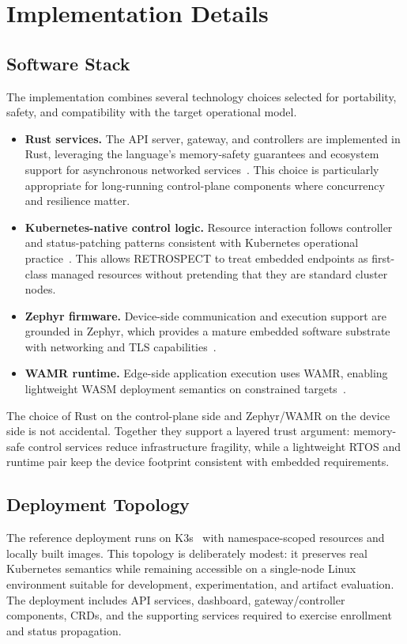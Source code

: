 \section{Implementation Details}

\subsection{Software Stack}
The implementation combines several technology choices selected for portability, safety, and compatibility with the target operational model.
\begin{itemize}
    \item \textbf{Rust services.} The API server, gateway, and controllers are implemented in Rust, leveraging the language's memory-safety guarantees and ecosystem support for asynchronous networked services~\cite{rust}. This choice is particularly appropriate for long-running control-plane components where concurrency and resilience matter.
    \item \textbf{Kubernetes-native control logic.} Resource interaction follows controller and status-patching patterns consistent with Kubernetes operational practice~\cite{kubernetes,kubernetes_operators}. This allows RETROSPECT to treat embedded endpoints as first-class managed resources without pretending that they are standard cluster nodes.
    \item \textbf{Zephyr firmware.} Device-side communication and execution support are grounded in Zephyr, which provides a mature embedded software substrate with networking and TLS capabilities~\cite{zephyr}.
    \item \textbf{WAMR runtime.} Edge-side application execution uses WAMR, enabling lightweight WASM deployment semantics on constrained targets~\cite{wamr}.
\end{itemize}

The choice of Rust on the control-plane side and Zephyr/WAMR on the device side is not accidental. Together they support a layered trust argument: memory-safe control services reduce infrastructure fragility, while a lightweight RTOS and runtime pair keep the device footprint consistent with embedded requirements.

\subsection{Deployment Topology}
The reference deployment runs on K3s~\cite{k3s} with namespace-scoped resources and locally built images. This topology is deliberately modest: it preserves real Kubernetes semantics while remaining accessible on a single-node Linux environment suitable for development, experimentation, and artifact evaluation. The deployment includes API services, dashboard, gateway/controller components, CRDs, and the supporting services required to exercise enrollment and status propagation.

